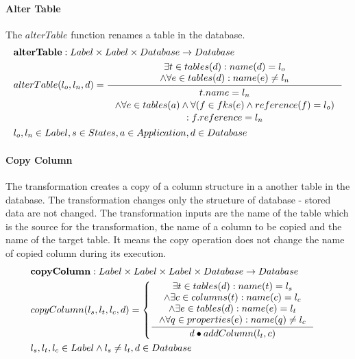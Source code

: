 \documentclass[11pt]{article}
\begin{document}
\paragraph{Alter Table} The $alterTable$ function renames a table in  the database.
\begin{align*}
&	\mathbf{alterTable} : Label \times Label \times Database \rightarrow Database \\
&	alterTable(l_o, l_n, d) = \inference{\exists t \in tables(d) : name(d) = l_o \\ \wedge \forall e \in tables(d) : name(e) \neq l_n}{\begin{gathered}
		t.name = l_n \\ \wedge \forall e \in tables(a) \wedge \forall (f \in fks(e) \wedge reference(f) = l_o ) \\ : f.reference = l_n 
	\end{gathered}}\\
&	l_o, l_n \in Label, s \in States, a \in Application, d \in Database
\end{align*}

\paragraph{Copy Column} The transformation creates a copy of a column structure in a another table in the database. The transformation changes only the structure of database - stored data are not changed. The transformation inputs are the name of the table which is the source for the transformation, the name of a column to be copied and the name of the target table. It means the copy operation does not change the name of copied column during its execution. 
\begin{align*}
&	\mathbf{copyColumn} : Label \times Label \times Label \times Database \rightarrow Database \\
&	copyColumn(l_s, l_t, l_c, d) = \begin{cases}
 		\inference{\exists t \in tables(d) : name(t) = l_s \\ \wedge \exists c \in columns(t) : name(c) = l_c \\ \wedge \exists e \in tables(d) : name(e) = l_t  \\ \wedge \forall q \in properties(e) : name(q) \neq l_c}{d \bullet addColumn(l_t, c)} 
	\end{cases} \\
&	l_s,l_t,l_c \in Label \wedge l_s \neq l_t,d \in Database
\end{align*}
\end{document}
